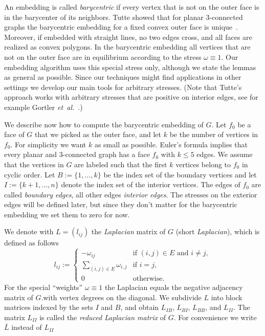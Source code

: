 \documentclass{article}
\theoremstyle{plain} \newtheorem{thm}{Theorem}[section]
\newcommand{\etal}{\emph{et~al.}}
\begin{document}
An embedding is called \emph{barycentric} if every vertex that is not
on the outer face is in the barycenter of its neighbors. Tutte showed
that for planar 3-connected graphs the barycentric embedding for a
fixed convex outer face is unique~\cite{t-crg-60,t-hdg-63}. Moreover,
if embedded with straight lines, no two edges cross, and all faces are
realized as convex polygons.  In the barycentric embedding all
vertices that are not on the outer face are in equilibrium according
to the stress $\omega\equiv 1$. Our embedding algorithm uses this
special stress only, although we state the lemmas as general as possible. Since our techniques might find applications in
other settings we develop our main tools for arbitrary
stresses. (Note that Tutte's approach works with
arbitrary stresses that are positive on interior
edges, see for example Gortler \etal~\cite{ggt-dofma-06}.)




We describe now how to compute the barycentric embedding of $G$. 
Let $f_0$ be a face of $G$ that we picked as the outer face, and let 
$k$ be the number of vertices in $f_0$. For simplicity we want $k$ as small as 
possible. 
Euler's formula implies that every planar and $3$-connected graph has a face $f_{0}$ with $k\leq 5$ edges. 
We assume that the vertices in $G$ are labeled such that the first $k$ vertices
belong to $f_0$ in cyclic order. 
Let $B:=\{1,\ldots,k\}$ be the index set of the boundary vertices and let $I:=\{k+1,\ldots,n\}$ denote the index set
of the interior  vertices.
The edges of $f_0$ are called \textit{boundary edges},
all other edges \textit{interior edges}. 
The stresses on the exterior edges will be defined later, but since they don't matter for the barycentric embedding we set them to zero for now.


We denote with $L=(l_{ij})$ the \emph{Laplacian} matrix of $G$ (short \emph{Laplacian}), which is defined as follows
\[l_{ij}:=
\begin{cases} -\omega_{ij} & \mbox{if $(i,j)\in E$ and $i\not=j$},\\ 
\sum_{(i,j)\in E} \omega_{i,j} & \mbox{if $i=j$}, \\
 0 & \mbox{otherwise}.
\end{cases}
\]For the special ``weights'' $\omega\equiv 1$ the Laplacian equals the
negative adjacency matrix of $G$.with vertex degrees on the diagonal.
We subdivide $L$ into block
matrices indexed by the  sets $I$ and $B$, and obtain $L_{IB}$, $L_{BI}$, $L_{BB}$, and $L_{II}$.
The matrix $L_{II}$ is called the \textit{reduced Laplacian matrix}  of $G$. For convenience we write $\bar L$ instead of $L_{II}$
\end{document}
